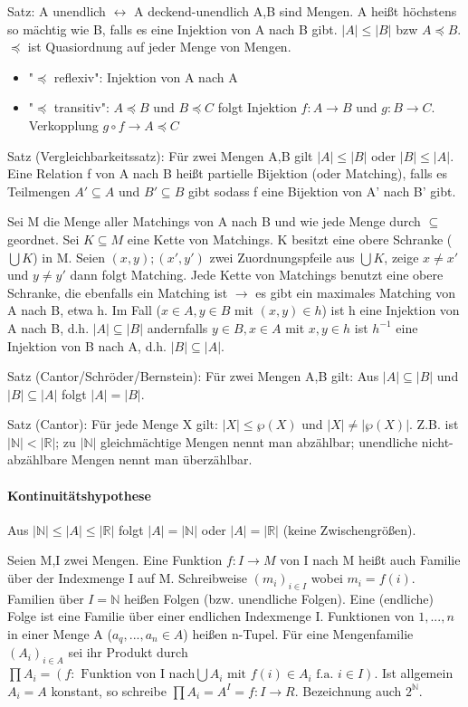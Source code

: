 \documentclass[10pt,landscape]{article}
\begin{document}
\begin{multicols}{3}
Satz: A unendlich $\leftrightarrow$ A deckend-unendlich
A,B sind Mengen. A heißt höchstens so mächtig wie B, falls es eine Injektion von A nach B gibt. $|A|\leq |B|$ bzw $A\preceq B$. $\preceq$ ist Quasiordnung auf jeder Menge von Mengen.
\begin{itemize}
    \item "$\preceq$ reflexiv": Injektion von A nach A
    \item "$\preceq$ transitiv": $A\preceq B$ und $B\preceq C$ folgt Injektion $f:A\rightarrow B$ und $g:B\rightarrow C$. Verkopplung $g \circ f \rightarrow A \preceq C$
\end{itemize}

Satz (Vergleichbarkeitssatz):
Für zwei Mengen A,B gilt $|A|\leq |B|$ oder $|B| \leq |A|$. Eine Relation f von A nach B heißt partielle Bijektion (oder Matching), falls es Teilmengen $A'\subseteq A$ und $B'\subseteq B$ gibt sodass f eine Bijektion von A' nach B' gibt.

Sei M die Menge aller Matchings von A nach B und wie jede Menge durch $\subseteq$ geordnet. Sei $K\subseteq M$ eine Kette von Matchings. K besitzt eine obere Schranke ($\bigcup K$) in M. Seien $(x,y);(x',y')$ zwei Zuordnungspfeile aus $\bigcup K$, zeige $x\not = x'$ und $y\not = y'$ dann folgt Matching.
Jede Kette von Matchings benutzt eine obere Schranke, die ebenfalls ein Matching ist $\rightarrow$ es gibt ein maximales Matching von A nach B, etwa h. Im Fall ($x\in A, y\in B$ mit $(x,y)\in h$) ist h eine Injektion von A nach B, d.h. $|A| \subseteq |B|$ andernfalls $y\in B, x\in A$ mit $x,y\in h$ ist $h^{-1}$ eine Injektion von B nach A, d.h. $|B| \subseteq |A|$.

Satz (Cantor/Schröder/Bernstein): 
Für zwei Mengen A,B gilt: Aus $|A|\subseteq |B|$ und $|B| \subseteq |A|$ folgt $|A| = |B|$.

Satz (Cantor):
Für jede Menge X gilt: $|X| \leq \wp(X)$ und $|X|\not= |\wp (X)|$. Z.B. ist $|\mathbb{N}|<|\mathbb{R}|$; zu $|\mathbb{N}|$ gleichmächtige Mengen nennt man abzählbar; unendliche nicht-abzählbare Mengen nennt man überzählbar.

\paragraph{Kontinuitätshypothese}
Aus $|\mathbb{N}|\leq |A| \leq |\mathbb{R}|$ folgt $|A|=|\mathbb{N}|$ oder $|A|=|\mathbb{R}|$ (keine Zwischengrößen).

Seien M,I zwei Mengen. Eine Funktion $f:I\rightarrow M$ von I nach M heißt auch Familie über der Indexmenge I auf M. Schreibweise $(m_i)_{i\in I}$ wobei $m_i=f(i)$. Familien über $I=\mathbb{N}$ heißen Folgen (bzw. unendliche Folgen).
Eine (endliche) Folge ist eine Familie über einer endlichen Indexmenge I. Funktionen von ${1,...,n}$ in einer Menge A ($a_q,...,a_n\in A$) heißen n-Tupel. Für eine Mengenfamilie $(A_i)_{i\in A}$ sei ihr Produkt durch $\prod A_i=(f: \text{ Funktion von I nach}\bigcup A_i \text{ mit } f(i)\in A_i \text{ f.a. } i\in I)$. Ist allgemein $A_i=A$ konstant, so schreibe $\prod A_i=A^I={f:I\rightarrow R}$. Bezeichnung auch $2^{\mathbb{N}}$.


\end{multicols}
\end{document}
